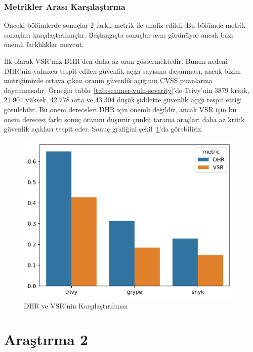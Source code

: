 \subsection{Metrikler Arası Karşılaştırma}\label{subsec:ComparisonBetweenMetrics}

Önceki bölümlerde sonuçlar 2 farklı metrik ile analiz edildi. Bu bölümde metrik sonuçları karşılaştırılmıştır. Başlangıçta sonuçlar aynı görünüyor ancak bazı önemli farklılıklar mevcut.

İlk olarak VSR'miz DHR'den daha az oran göstermektedir. Bunun nedeni DHR'nin yalnızca tespit edilen güvenlik açığı sayısına dayanması, ancak bizim metriğimizde ortaya çıkan oranın güvenlik açığının CVSS puanlarına dayanmasıdır. Örneğin tablo~\ref{tab:scanner-vuln-severity}'de Trivy'nin 3879 kritik, 21.904 yüksek, 42.778 orta ve 43.304 düşük şiddette güvenlik açığı tespit ettiği görülebilir. Bu önem dereceleri DHR için önemli değildir, ancak VSR için bu önem derecesi farkı sonuç oranını düşürür çünkü tarama araçları daha az kritik güvenlik açıkları tespit eder. Sonuç grafiğini şekil~\ref{fig:comparison-dhr-vsr}'da görebiliriz.

\begin{figure}[!htbp]
    \centering
    \includegraphics[width=1\linewidth]{images/s1/comparison-dhr-vsr.png}
    \caption{DHR ve VSR'nin Karşılaştırılması}\label{fig:comparison-dhr-vsr}
\end{figure}

\chapter{Araştırma 2}\label{ch:arastirma2}

